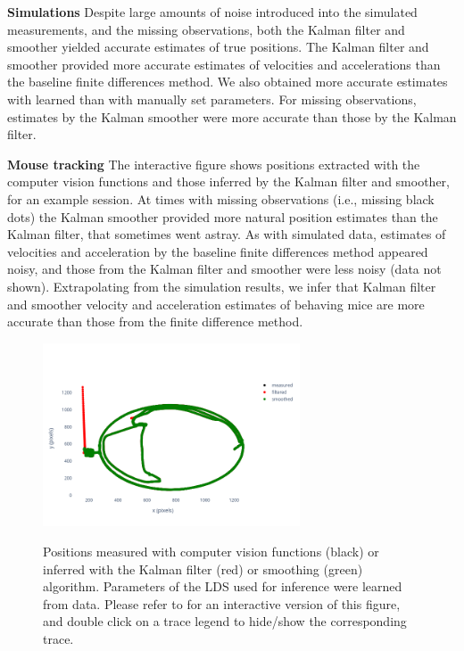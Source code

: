 
\noindent\textbf{Simulations}
%
Despite large amounts of noise introduced into the simulated measurements, and
the missing observations, both the Kalman filter and smoother yielded accurate
estimates of true positions.
%
The Kalman filter and smoother provided more accurate estimates of velocities
and accelerations than the baseline finite differences method.
%
We also obtained more accurate estimates with learned than with manually set
parameters.
%
For missing observations, estimates by the Kalman smoother were more accurate
than those by the Kalman filter.

\noindent\textbf{Mouse tracking}
%
The interactive figure shows positions extracted with the computer vision
functions and those inferred by the Kalman filter and smoother, for an example
session. At times with missing observations (i.e., missing black dots) the
Kalman smoother provided more natural position estimates than the Kalman
filter, that sometimes went astray.
% 
As with simulated data, estimates of velocities and acceleration by the
baseline finite differences method appeared noisy, and those from the Kalman
filter and smoother were less noisy (data not shown). Extrapolating from the
simulation results, we infer that Kalman filter and smoother velocity and
acceleration estimates of behaving mice are more accurate than those from the
finite difference method.

\begin{figure}
    \begin{center}

        \href{http://www.gatsby.ucl.ac.uk/~rapela/fwg/reports/learning/figures/positions_smoothed_session003_start0.00_end15548.27_startPosition0_numPosition10000_pos_learnedParams.html}{\includegraphics[width=3in]{figures/positions_smoothed_session003_start0.00_end15548.27_startPosition0_numPosition10000_pos_learnedParams.png}}

        \caption{Positions measured with computer vision functions (black) or
        inferred with the Kalman filter (red) or smoothing (green) algorithm.
        Parameters of the LDS used for inference were learned from data.
        Please refer to \cite{c3} for an interactive version of this figure,
        and double click on a trace legend to hide/show the corresponding
        trace.}

    \end{center}
\end{figure}

